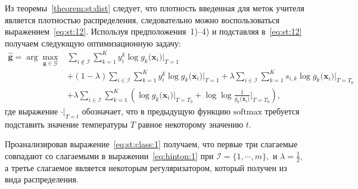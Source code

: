 Из теоремы~\ref{theorem:st:dist} следует, что плотность введенная для меток учителя является плотностью распределения, следовательно можно воспользоваться выражением~\eqref{eq:st:12}.
Используя предположения~1)--4) и подставляя в~\eqref{eq:st:12} получаем следующую оптимизационную задачу:
\[
\label{eq:st:class:1}
\begin{aligned}
\hat{\mathbf{g}} = \arg\max_{\mathbf{g}\in \mathcal{G}} & \sum_{i\not\in \mathcal{I}}\sum_{k=1}^{K}y_i^k\log g_k\bigr(\mathbf{x}_i\bigr)\bigr|_{T=1} \\
&+ \left(1-\lambda\right)\sum_{i\in \mathcal{I}}\sum_{k=1}^{K}y_i^k\log g_k\bigr(\mathbf{x}_i\bigr)\bigr|_{T=1} + \lambda\sum_{i\in \mathcal{I}}\sum_{k=1}^{K}s_{i,k}\log g_k\bigr(\mathbf{x}_i\bigr)\bigr|_{T=T_0} \\
&+ \lambda \sum_{i\in \mathcal{I}}\sum_{k=1}^{K}\left(\log g_k\bigr(\mathbf{x}_i\bigr)\bigr|_{T=T_0} + \log\log\frac{1}{g_k\bigr(\mathbf{x}_i\bigr)}\bigr|_{T=T_0}\right),
\end{aligned}
\]
где выражение $\cdot\bigr|_{T=t}$ обозначает, что в предыдущую функцию $\text{softmax}$ требуется подставить значение температуры $T$ равное некоторому значению $t$.

Проанализировав выражение~\eqref{eq:st:class:1} получаем, что первые три слагаемые совпадают со слагаемыми в выражении~\eqref{eq:hinton:1} при $\mathcal{I} = \{1, \cdots, m\},$ и $\lambda=\frac{1}{2}$, а третье слагаемое является некоторым регуляризатором, который получен из вида распределения.

